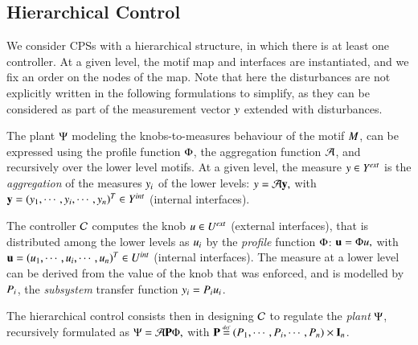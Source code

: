 \documentclass[runningheads]{llncs}
\newcommand{\bydef}{\mathbin{\stackrel{\scriptscriptstyle\mathit{def}}{=}}}
\newcommand{\motif}[1][]{M\ifx#1\relax\else^{#1}\fi}
\newcommand{\measure}[1][]{y\ifx#1\relax\else^{#1}\fi}
\newcommand{\measurerange}[1][]{Y\ifx#1\relax\else^{#1}\fi}
\newcommand{\measurevect}[1][]{\textbf{y}\ifx#1\relax\else^{#1}\fi}
\newcommand{\knob}[1][]{u\ifx#1\relax\else^{#1}\fi}
\newcommand{\knobrange}[1][]{U\ifx#1\relax\else^{#1}\fi}
\newcommand{\knobvect}[1][]{\textbf{u}\ifx#1\relax\else^{#1}\fi}
\newcommand{\profile}[1][]{\Phi\ifx#1\relax\else^{#1}\fi}
\newcommand{\aggregation}[1][]{\mathcal{A}\ifx#1\relax\else^{#1}\fi}
\newcommand{\plant}[1][]{\Psi\ifx#1\relax\else^{#1}\fi}
\newcommand{\subplant}[1][]{P\ifx#1\relax\else^{#1}\fi}
\newcommand{\controller}[1][]{\mathcal{C}\ifx#1\relax\else^{#1}\fi}
\newcommand{\external}[2][]{\ifx\relax#2\relax#1\mathit{ext}\else#2[#1\mathit{ext}]\fi}
\newcommand{\internal}[2][]{#2[#1\mathit{int}]}
\begin{document}
\subsection{Hierarchical Control}

We consider CPSs with a hierarchical structure, in which there is at least one controller. At a given level, the motif map and interfaces are instantiated, and we fix an order on the nodes of the map.
Note that here the disturbances are not explicitly written in the following formulations to simplify, as they can be considered as part of the measurement vector $\measure$ extended with disturbances.

The plant $\plant$ modeling the knobs-to-measures behaviour of the motif $\motif$, can be expressed using the profile function $\profile$, the aggregation function $\aggregation$, and recursively over the lower level motifs. 
At a given level, the measure \(\measure \in \external{\measurerange}\) is the \emph{aggregation} of the measures \(\measure_i\) of the lower levels:
\(
\measure = \aggregation \measurevect,
\)
with \( \measurevect = (\measure_1, \cdots, \measure_i, \cdots, \measure_n)^T \in \internal{\measurerange}\) (internal interfaces).

The controller \(\controller\) computes the knob \(\knob \in \external{\knobrange}\) (external interfaces), that is distributed among the lower levels as \(\knob_i\) by the \emph{profile} function \(\profile\):
\(
\label{eq:profile}
    \knobvect = \profile \knob,
\)
with \( \knobvect = (\knob_1, \cdots, \knob_i, \cdots, \knob_n)^T \in \internal{\knobrange}\) (internal interfaces).
%
The measure at a lower level can be derived from the value of the knob that was enforced, and is modelled by \(\subplant_i\), the \emph{subsystem} transfer function
\(
    \measure_i = \subplant_i \knob_i
\).

The hierarchical control consists then in designing \( \controller \) to regulate the \emph{plant} \(\plant\), recursively formulated as
$
\plant = \aggregation \mathbf{\subplant} \profile,
$
with \(\mathbf{\subplant} \bydef (\subplant_1, \cdots, \subplant_i, \cdots, \subplant_n) \times \textbf{I}_n\).
\end{document}
